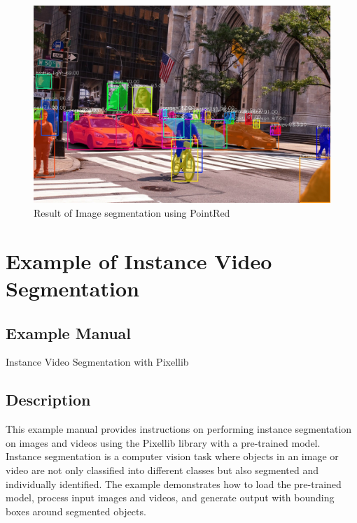 \begin{figure}[h!]
    \centering
    \includegraphics[width=0.8\linewidth]{Images/PixelLib/seg2.jpeg} %
    
    \caption{Result of Image segmentation using PointRed}
    \label{fig:your_image_label}
    
    
\end{figure}
\newpage		



\section{Example of Instance Video Segmentation}
\subsection{Example Manual}
Instance Video Segmentation with Pixellib
\subsection{Description}
This example manual provides instructions on performing instance segmentation on images and videos using the Pixellib library with a pre-trained model. Instance segmentation is a computer vision task where objects in an image or video are not only classified into different classes but also segmented and individually identified. The example demonstrates how to load the pre-trained model, process input images and videos, and generate output with bounding boxes around segmented objects.

